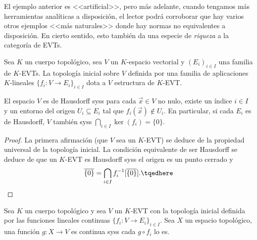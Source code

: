 \documentclass[topologia-analisis.tex]{subfiles}
\begin{document}
El ejemplo anterior es <<artificial>>, pero más adelante, cuando tengamos más herramientas analíticas a disposición, el lector podrá corroborar
que hay varios otros ejemplos <<más naturales>> donde hay normas no equivalentes a disposición.
En cierto sentido, esto también da una especie de \emph{riqueza} a la categoría de EVTs.

\begin{lem}
	Sea $K$ un cuerpo topológico, sea $V$ un $K$-espacio vectorial y $(E_i)_{i\in I}$ una familia de $K$-EVTs.
	La topología inicial sobre $V$ definida por una familia de aplicaciones $K$-lineales $\{ f_i \colon V \to E_i \}_{i\in I}$
	dota a $V$ estructura de $K$-EVT.

	El espacio $V$ es de Hausdorff syss para cada $\vec x \in V$ no nulo, existe un índice $i \in I$ y un entorno del origen $U_i \subseteq E_i$
	tal que $f_i(\vec x) \notin U_i$.
	En particular, si cada $E_i$ es de Hausdorff, $V$ también syss $\bigcap_{i\in I} \ker(f_i) = \{ 0 \}$.
\end{lem}
\begin{proof}
	La primera afirmación (que $V$ sea un $K$-EVT) se deduce de la propiedad universal de la topología inicial.
	La condición equivalente de ser Hausdorff se deduce de que un $K$-EVT es Hausdorff syss el origen es un punto cerrado y
	\begin{equation}
		\overline{\{ 0 \}} = \bigcap_{i\in I} f_i^{-1}[\overline{\{ 0 \}}].
		\tqedhere
	\end{equation}
\end{proof}
\begin{cor}
	Sea $K$ un cuerpo topológico y sea $V$ un $K$-EVT con la topología inicial definida por
	las funciones lineales continuas $\{ f_i \colon V \to E_i \}_{i\in I}$.
	Sea $X$ un espacio topológico, una función $g \colon X \to V$ es continua syss cada $g\circ f_i$ lo es.
\end{cor}
\end{document}
